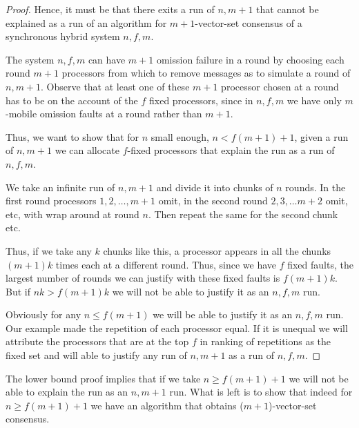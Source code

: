 \documentclass[11pt]{article}
\newcommand{\commentout}[1]{}
\begin{document}
\begin{proof}
Hence, it must be that there exits a run of  $n,m+1$ that cannot be explained as a run of
an algorithm for $m+1$-vector-set consensus of a synchronous hybrid system $n,f,m$.

The system $n,f,m$ can have $m+1$ omission failure in a round by choosing each round $m+1$ processors 
from which to remove messages as to simulate a round of $n,m+1$. Observe that at least one of these $m+1$
processor chosen at a round has to be on the account of the $f$ fixed processors, since in $n,f,m$ we have only 
$m$-mobile omission faults at a round rather than $m+1$.

Thus, we want to show that for $n$ small enough, $n<f(m+1)+1$, given a run of $n,m+1$ we can allocate $f$-fixed
processors that explain the run as a run of $n,f,m$.



We take an infinite run of $n,m+1$ and divide it into chunks of $n$ rounds. In the first 
round processors $1,2, \ldots, m+1$ omit, in the second round $2,3, \ldots m+2$ omit, etc, with wrap around
at round $n$. Then repeat the same for the second chunk etc.

Thus, if we take any $k$ chunks like this, a processor appears in all the chunks $(m+1)k$ times each at a different round.
Thus, since we have $f$ fixed faults, the largest number of rounds we can justify with these
fixed faults is $f(m+1)k$. But if $nk>f(m+1)k$ we will not be able to justify it as an $n,f,m$ run.

Obviously for any $n \leq f(m+1)$ we will be able to justify it as an $n,f,m$ run.
Our example made the repetition of each processor equal. If it is unequal we will attribute
the processors that are at the top $f$ in ranking of repetitions as the fixed set and will
able to justify any run of $n,m+1$ as a run of $n,f,m$.
\commentout{
Take some $k$ rounds such that the number of appearances of each processor omitting is the same and
the run is completely symmetric under the exchange of two ids modulo permutation of rounds.
Let $A_i$ be the set of processors assigned to round $i$.
$$A_i=\{p_\ell\mid \ell=1+ ((j-1+(i-1)(m+1))\mod n), \mbox{ for }1\le j\le m+1\}\,.$$

Thus a processor appears in at most $(m+1)k/n$ rounds. Thus, the largest number of rounds for which
we can attribute at least one id to the $f$-fixed omission set is $f(m+1)k/n$. Since we need at least
one processor from the $f$-fixed set in each round we get the condition $f(m+1)k/n \geq k,$
which yields $n \leq f(m+1)$.
}
\end{proof}
The lower bound proof implies that if we take $n\geq f(m+1)+1$ we will not be able to explain the run as an $n,m+1$ run.
What is left is to show that indeed for $n\geq f(m+1)+1$ we have an algorithm that obtains ($m+1$)-vector-set consensus.
\end{document}
